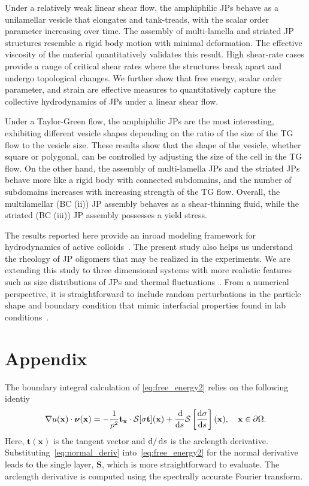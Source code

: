 \documentclass[prb,preprint,showpacs,preprintnumbers,amsmath,amssymb,longbibliography]{revtex4-1}
\newcommand{\DD}{\mathcal{D}}
\newcommand{\SSS}{\mathcal{S}}
\newcommand{\nnu}{\boldsymbol{\nu}}
\renewcommand{\SS}{\mathbf{S}}
\newcommand{\xx}{\mathbf{x}}
\renewcommand{\tt}{\mathbf{t}}
\begin{document}
Under a relatively weak linear shear flow, the amphiphilic JPs behave as
a unilamellar vesicle that elongates and tank-treads, with the scalar
order parameter increasing over time. The assembly of multi-lamella and
striated JP structures resemble a rigid body motion with minimal
deformation. The effective viscosity of the material quantitatively
validates this result. High shear-rate cases provide a range of critical
shear rates where the structures break apart and undergo topological
changes. We further show that free energy, scalar order parameter, and
strain are effective measures to quantitatively capture the collective hydrodynamics of
JPs under a linear shear flow.

Under a Taylor-Green flow, the amphiphilic JPs are the most interesting,
exhibiting different vesicle shapes depending on the ratio of the size
of the TG flow to the vesicle size. These results show that the shape of
the vesicle, whether square or polygonal, can be controlled by adjusting
the size of the cell in the TG flow. On the other hand, the assembly of
multi-lamella JPs and the striated JPs behave more like a rigid body
with connected subdomains, and the number of subdomains increases with
increasing strength of the TG flow. Overall, the multilamellar (BC (ii))
JP assembly behaves as a shear-thinning fluid, while the striated (BC
(iii)) JP assembly  possesses a yield stress.

The results reported here provide an inroad modeling framework for
hydrodynamics of active colloids~\cite{Meredithetal2022,
McGlassonBradley2021, Vutukuri2020, Mallory2017}. The present study also
helps us understand the rheology of JP oligomers that may be realized in
the experiments. We are extending this study to three dimensional
systems with more realistic features such as size distributions of JPs
and thermal fluctuations~\cite{kohl-cor-che-vee22}. From a numerical
perspective, it is straightforward to include random perturbations in
the particle shape and boundary condition that mimic interfacial
properties found in lab conditions~\cite{Bradley2016, Bradley2017,
Zarzaretal2015, doi:10.1021/la503455h}.

\section{Appendix}
\label{sec:appendix}
The boundary integral calculation
of \ref{eq:free_energy2} relies
on the following identiy 
%
\begin{equation}
\label{eq:normal_deriv}
\nabla u(\xx) \cdot \nnu(\xx)=
-\frac{1}{\rho^2} {\bf t}_\xx\cdot \SSS[\sigma{\bf t}](\xx)
+ \frac{\dif}{\dif s}\SSS\left[\frac{\dif \sigma}{\dif s}\right](\xx), \quad \xx \in \partial \Omega.
\end{equation}
%
Here, $\tt(\xx)$ is the tangent vector and $\dif/\dif s$ is the
arclength derivative.
Substituting~\eqref{eq:normal_deriv}
into~\eqref{eq:free_energy2} for the normal derivative leads to the
single layer, $\SS$, which is more straightforward to evaluate.
The arclength derivative is computed using
the spectrally accurate Fourier transform.
\end{document}
